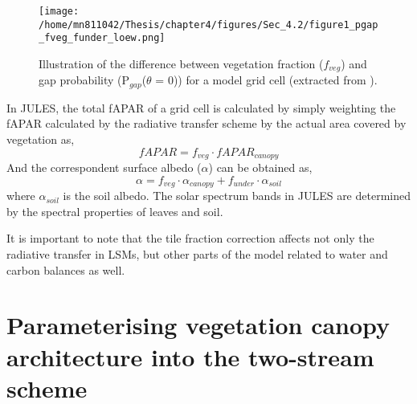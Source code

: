 \begin{figure}
\centering
\texttt{[image: /home/mn811042/Thesis/chapter4/figures/Sec\_4.2/figure1\_pgap\_fveg\_funder\_loew.png]}
\caption{Illustration of the difference between vegetation fraction ($f_{veg}$) and gap probability (P$_{gap}$($\theta$ = 0)) for a model grid cell (extracted from \citet{loew2014}).} 
\label{f:loew2014}
\end{figure}
In JULES, the total fAPAR of a grid cell is calculated by simply weighting the fAPAR calculated by the radiative transfer scheme by the actual area covered by vegetation as, 
\begin{equation}
fAPAR = f_{veg} \cdot fAPAR_{canopy}
\label{equation:faparvegfraction}
\end{equation}
And the correspondent surface albedo ($\alpha$) can be obtained as, 
\begin{equation}
\alpha = f_{veg} \cdot \alpha_{canopy}  +  f_{under} \cdot \alpha_{soil}
\label{equation:albedovegfraction}
\end{equation}
\noindent where $\alpha_{soil}$ is the soil albedo. The solar spectrum bands in JULES are determined by the spectral properties of leaves and soil.

It is important to note that the tile fraction correction affects not only the radiative transfer in LSMs, but other parts of the model related to water and carbon balances as well. 

\section{Parameterising vegetation canopy architecture into the two-stream scheme}

